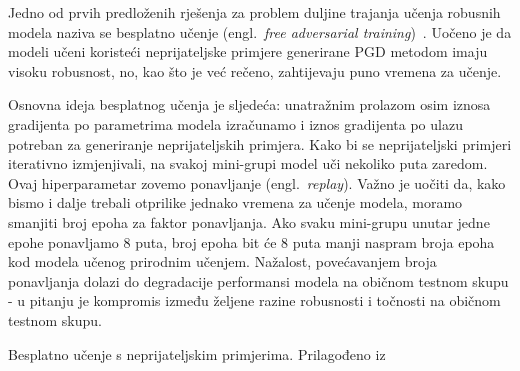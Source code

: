 \documentclass[times, utf8, zavrsni, numeric]{fer}
\begin{document}
Jedno od prvih predloženih rješenja za problem duljine trajanja učenja robusnih modela naziva se besplatno učenje (engl.\ \textit{free adversarial training})~\cite{shafahi2019adversarial}.
Uočeno je da modeli učeni koristeći neprijateljske primjere generirane PGD metodom imaju visoku robusnost, no, kao što je već rečeno, zahtijevaju puno vremena za učenje.

Osnovna ideja besplatnog učenja je sljedeća: unatražnim prolazom osim iznosa gradijenta po parametrima modela izračunamo i iznos gradijenta po ulazu potreban za generiranje neprijateljskih primjera.
Kako bi se neprijateljski primjeri iterativno izmjenjivali, na svakoj mini-grupi model uči nekoliko puta zaredom. Ovaj hiperparametar zovemo ponavljanje (engl.\ \textit{replay}).
Važno je uočiti da, kako bismo i dalje trebali otprilike jednako vremena za učenje modela, moramo smanjiti broj epoha za faktor ponavljanja. 
Ako svaku mini-grupu unutar jedne epohe ponavljamo 8 puta, broj epoha bit će 8 puta manji naspram broja epoha kod modela učenog prirodnim učenjem.
Nažalost, povećavanjem broja ponavljanja dolazi do degradacije performansi modela na običnom testnom skupu - u pitanju je kompromis između željene razine robusnosti i točnosti na običnom testnom skupu.

\begin{algorithm}
    \caption{Besplatno učenje s neprijateljskim primjerima. Prilagođeno iz~\cite{wong2020fast}}
    \label{algo:adv_learning_free}
    \begin{algorithmic}
        \\\hrulefill
                \ENDFOR
            \ENDFOR
        \ENDFOR
    \end{algorithmic}
\end{algorithm}

\pagebreak
\end{document}
